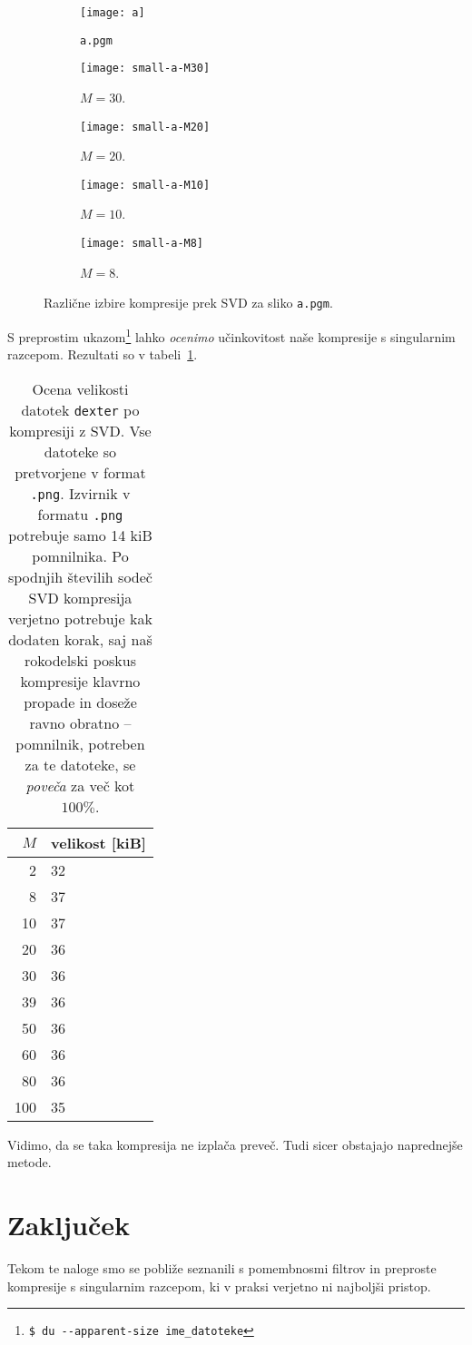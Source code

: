 \documentclass[a4 paper, 12pt]{article}
\begin{document}
\begin{figure}[H]\centering
	\begin{subfigure}[b]{0.18\textwidth}
		\texttt{[image: a]}
		\caption{{\tt a.pgm}}
		\label{Sa1}
	\end{subfigure}
	\begin{subfigure}[b]{0.18\textwidth}
		\texttt{[image: small-a-M30]}
		\caption{$M = 30$.}
		\label{Sa2}
	\end{subfigure}
	\begin{subfigure}[b]{0.18\textwidth}
		\texttt{[image: small-a-M20]}
		\caption{$M = 20$.}
		\label{Sa3}
	\end{subfigure}
	\begin{subfigure}[b]{0.18\textwidth}
		\texttt{[image: small-a-M10]}
		\caption{$M = 10$.}
		\label{Sa4}
	\end{subfigure}
	\begin{subfigure}[b]{0.18\textwidth}
		\texttt{[image: small-a-M8]}
		\caption{$M = 8$.}
		\label{Sa5}
	\end{subfigure}
	\caption{Razli\v cne izbire kompresije prek SVD za sliko {\tt a.pgm}.}
	\label{Sa}
\end{figure}

S preprostim ukazom\footnote{{\tt \$ du {}-{}-apparent-size ime\_datoteke}} lahko \emph{ocenimo}
u\v cinkovitost na\v se kompresije s singularnim razcepom. Rezultati so v tabeli~\ref{tab1}.
\begin{table}[H]\centering
	\caption{Ocena velikosti datotek {\tt dexter} po kompresiji z SVD. Vse datoteke so
	pretvorjene v format {\tt .png}. Izvirnik v formatu {\tt .png} potrebuje samo
	14 kiB pomnilnika. Po spodnjih \v stevilih sode\v c SVD kompresija verjetno potrebuje
 	kak dodaten korak, saj na\v s rokodelski poskus kompresije klavrno propade in dose\v ze
	ravno obratno -- pomnilnik, potreben za te datoteke, se \emph{pove\v ca} za ve\v c
	kot $100\%$.}
	\begin{tabular}{r|l}
		$M$ & velikost [kiB] \\
		\hline
		2  & 32 \\
		8  & 37 \\
		10 & 37 \\
		20 & 36 \\
		30 & 36 \\
		39 & 36 \\
		50 & 36 \\
		60 & 36 \\
		80 & 36 \\
		100& 35
	\end{tabular}
	\label{tab1}
\end{table}
Vidimo, da se taka kompresija ne izpla\v ca preve\v c. Tudi sicer obstajajo naprednej\v se metode.

\section{Zaklju\v cek}

Tekom te naloge smo se pobli\v ze seznanili s pomembnosmi filtrov in preproste kompresije s singularnim
razcepom, ki v praksi verjetno ni najbolj\v si pristop.
\end{document}
